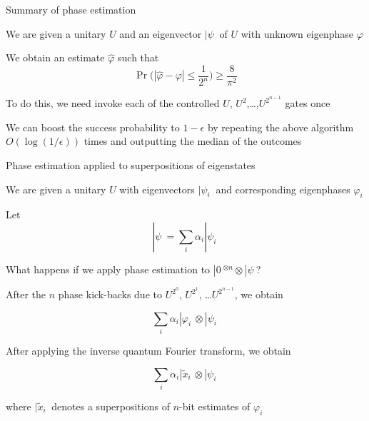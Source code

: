 \begin{frame}{Summary of phase estimation}

\bigskip
We are given a unitary $U$ and an eigenvector $|\psi\>$ of $U$ with unknown eigenphase $\varphi$

\bigskip
We obtain an estimate $\hat{\varphi}$ such that
\[
   \Pr\big(|\hat{\varphi} - \varphi| \le \frac{1}{2^n}\big) \ge \frac{8}{\pi^2}
\]

\medskip
To do this, we need invoke each of the controlled $U$, $U^2$,\ldots,$U^{2^{n-1}}$ gates once \pause

\bigskip
We can boost the success probability to $1-\epsilon$ by repeating the above algorithm $O(\log(1/\epsilon))$ times and outputting the median of the outcomes

\end{frame}




\begin{frame}{Phase estimation applied to superpositions of eigenstates}

\bigskip
We are given a unitary $U$ with eigenvectors $|\psi_i\>$ and corresponding eigenphases $\varphi_i$

\bigskip
Let 
\[
|\psi\> = \sum_i \alpha_i |\psi_i\>
\]

\pause

\bigskip
What happens if we apply phase estimation to $|0\>^{\otimes n} \otimes |\psi\>$?

\pause

\bigskip
After the $n$ phase kick-backs due to $U^{2^0}$, $U^{2^1}$, \ldots $U^{2^{n-1}}$, we obtain

\[
\sum_i \alpha_i |\varphi_i\> \otimes |\psi_i\>
\]

\pause

\bigskip
After applying the inverse quantum Fourier transform, we obtain

\[
\sum_i \alpha_i |\tilde{x}_i\> \otimes |\psi_i\>
\]

where $|\tilde{x}_i\>$ denotes a superpositions of $n$-bit estimates of $\varphi_i$

\end{frame}

